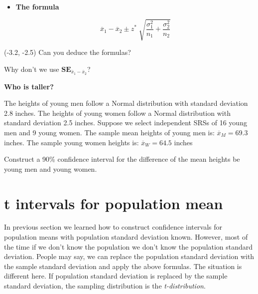 \documentclass[a4paper, 12pt,twoside]{book}
\begin{document}
\begin{itemize}
\begin{itemize}
     \end{itemize}
     
        \begin{textblock}{4.5}(-3.2, -2.5) 
    Describe the sampling distribution of $\overline{x}_1 - \overline{x}_2$ if all the conditions are met.
   \end{textblock}
   
 \item \textbf{The formula}  \vspace{0.3cm}  
 
     $$\overline{x}_1 - \overline{x}_2 \pm z^*\; \sqrt{\frac{\sigma_1^2}{n_1} + \frac{\sigma_2^2}{n_2}}$$

 \end{itemize}
 
   \begin{textblock}{4.8}(-3.2, -2.5) 
   Can you deduce the formulas?\vspace{0.3cm}
   
   Why don't we use $\textbf{SE}_{\overline{x}_1 - \overline{x}_2 }$?
   \end{textblock}
   \newpage
   \colorbox{champagne}{\parbox{\textwidth}{
   \textbf{Who is taller?}\vspace{0.3cm}
   
    The heights of young men follow a Normal distribution with  standard deviation 2.8 inches. The heights of young women follow a Normal distribution with standard deviation 2.5 inches. Suppose we select independent SRSs of 16 young men and 9 young women. The sample mean heights  of young men is:  $\overline{x}_M = 69.3$ inches. The sample young women heights is: $\overline{x}_W = 64.5$ inches\vspace{0.3cm}
    
    Construct a 90\% confidence interval for the difference of the mean heights be young men and young women.
   }}
   
   \newpage
   
   \section{t intervals for population mean}
   In previous section we learned how to construct confidence intervals for population means with population standard deviation known. However, most of the time if we don't know the population we don't know the population standard deviation. People may say, we can replace the population standard deviation with the sample standard deviation and apply the above formulas. The situation is different here. If population standard deviation is replaced by the sample standard deviation, the sampling distribution is the \textit{t-distribution}.\vspace{0.3cm}
   
\end{document}
